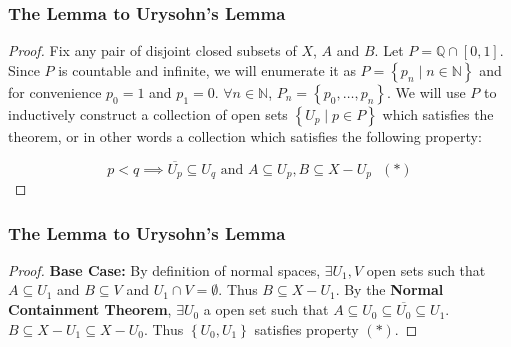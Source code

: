 \documentclass{beamer}
\newcommand*{\subeq}{\subseteq}
\newcommand*{\empset}{\emptyset}
\newcommand{\Q}{\mathbb{Q}}
\newcommand{\N}{\mathbb{N}}
\begin{document}
\begin{frame}
    \frametitle{The Lemma to Urysohn's Lemma}

    \begin{proof}
        \renewcommand{\qedsymbol}{}
        Fix any pair of disjoint closed subsets of $X$, $A$ and $B$. Let $P = \Q \cap [0, 1]$. Since $P$ is countable and infinite, we will enumerate it as $P = \left\{ p_n \mid n \in \N \right\}$ and for convenience $p_0 = 1$ and $p_1 = 0$. $\forall n \in \N$, $P_n = \left\{ p_0, \dots, p_n \right\}$. We will use $P$ to inductively construct a collection of open sets $\left\{ U_p \mid p \in P \right\}$ which satisfies the theorem, or in other words a collection which satisfies the following property:
        
        \begin{equation*}
            p < q \implies \overline{U_p} \subeq U_q \text{ and } A \subeq U_p, B \subeq X - U_p \text{ }(*)
        \end{equation*}
    \end{proof}

\end{frame}

\begin{frame}
    \frametitle{The Lemma to Urysohn's Lemma}

    \begin{proof}
        \textbf{Base Case:} By definition of normal spaces, $\exists U_1, V$ open sets such that $A \subeq U_1$ and $B \subeq V$ and $U_1 \cap V = \empset$. Thus $B \subeq X - U_1$. By the \textbf{Normal Containment Theorem}, $\exists U_0$ a open set such that $A \subeq U_0 \subeq \overline{U_0} \subeq U_1$. $B \subeq X - U_1 \subeq X - U_0$. Thus $\left\{ U_0, U_1 \right\}$ satisfies property $(*)$.  
    \end{proof}

\end{frame}
\end{document}
